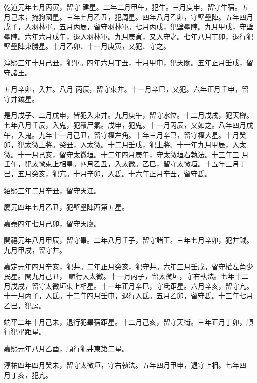 \begin{pinyinscope}
 乾道元年七月丙寅，留守
 建星。二年二月甲午，犯牛。三月庚申，留守牛宿。五月己未，掩狗國星。三年七月乙丑，犯周星。四年八月乙卯，守壁壘陣。五年四月戊子，入羽林軍。五月丙辰，留守羽林軍。七月丙戌，犯壁壘陣。九月甲戌，守壁壘陣。六年六月戊午，退入羽林軍。九月庚寅，又入守之。七年八月丁卯，退行犯壁壘陣東勝星。十月乙卯、十一月庚寅，又犯、守之。



 淳熙三年十月己丑，犯畢。四年六月丁丑，十月甲申，犯天關。五年正月壬戌，留守諸王。



 五月辛卯，入井。八月
 丙辰，留守東井。十一月辛巳，又犯。六年正月壬申，留守井鉞星。



 是月戊子、二月戊申，皆犯入東井。九月庚午，留守水位。十二月戊戌，犯天樽。七年八月壬辰，入鬼，犯積尸氣。戊申，犯鬼。十一月丙辰，又如之。八年四月戊午，入鬼。九年十一月己丑，留守權左角。十年三月辛巳，留守權大星。十月癸卯，犯太微上將。癸丑，入太微。十二月壬戌，犯上將。十一年九月甲辰，入太微。十一月己亥，留守太微垣。十二年四月庚午，守太微垣右執法。十三年三
 月壬午，犯太微東上相星。四月乙丑，入太微。乙巳，留守太微垣。十五年三月丁巳，五月癸亥，犯亢。十月辛卯，入氐。十六年正月辛丑，留守氐。



 紹熙三年二月辛丑，留守天江。



 慶元四年七月乙丑，犯壁壘陣西第五星。



 嘉泰四年七月己卯，留守天廩。



 開禧元年八月甲辰，留守畢。二年八月壬子，留守諸王。三年七月辛卯，犯井鉞。九月甲戌，留守井。



 嘉定元年四月辛亥，犯井。二年正月癸亥，犯守井。六年三月壬戌，留守權左角少民星。閏九月己丑，
 順行入太微。十一月丙子，留太微垣，守右執法。七年十二月戊戌，留守太微垣東上相星。十一年正月辛巳，守氐距星。六月辛亥，留守亢。十一月丙子，入氐。十二年四月壬申，退行入氐。五月乙卯，留守氐。十三年七月乙巳，犯房。



 端平二年十月己未，退行犯畢宿距星。十二月己亥，留守天街。三年正月丁卯，順行犯畢距星。



 嘉熙元年八月乙酉，順行犯井東第二星。



 淳祐四年四月癸未，留守太微垣，守右執法。五年四月甲申，退守上相。七年四
 月丁亥，犯亢。




\end{pinyinscope}
